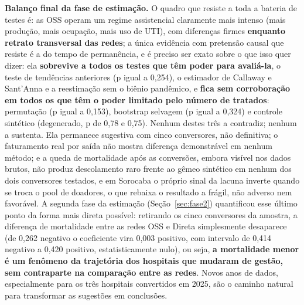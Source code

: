 \newpage
\textbf{Balanço final da fase de estimação.} O quadro que resiste a
toda a bateria de testes é: as OSS operam um regime assistencial
claramente mais intenso (mais produção, mais ocupação, mais uso de
UTI), com diferenças firmes \textbf{enquanto retrato transversal das
redes}; a única evidência com pretensão causal que resiste é a do
tempo de permanência, e é preciso ser exato sobre o que isso quer
dizer: ela \textbf{sobrevive a todos os testes que têm poder para
avaliá-la}, o teste de tendências anteriores (p igual a 0,254), o
estimador de Callaway e Sant'Anna e a reestimação sem o biênio
pandêmico, e \textbf{fica sem corroboração em todos os que têm o
poder limitado pelo número de tratados}: permutação (p igual a 0,153),
bootstrap selvagem (p igual a 0,324) e controle sintético (degenerado,
p de 0,78 e 0,75). Nenhum destes três a contradiz; nenhum a sustenta.
Ela permanece sugestiva com cinco conversores, não definitiva; o faturamento
real por saída não mostra diferença demonstrável em nenhum método; e
a queda de mortalidade após as conversões, embora visível nos dados
brutos, não produz descolamento raro frente ao gêmeo sintético em
nenhum dos dois conversores testados, e em Sorocaba o próprio sinal
da lacuna inverte quando se troca o pool de doadores, o que rebaixa o
resultado a frágil, não adverso nem favorável. A segunda fase da estimação
(Seção~\ref{sec:fase2}) quantificou esse último ponto da forma mais
direta possível: retirando os cinco conversores da amostra, a
diferença de mortalidade entre as redes OSS e Direta simplesmente
desaparece (de 0,262 negativo o coeficiente vira 0,003 positivo, com
intervalo de 0,414 negativo a 0,420 positivo, estatisticamente nulo),
ou seja, \textbf{a mortalidade menor é um fenômeno da trajetória dos
hospitais que mudaram de gestão, sem contraparte na comparação entre
as redes}. Novos anos de dados, especialmente
para os três hospitais convertidos em 2025, são o caminho natural para
transformar as sugestões em conclusões.
